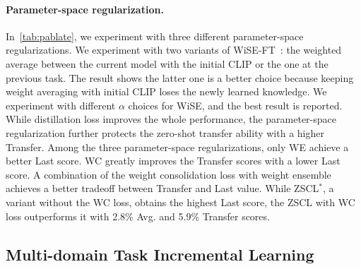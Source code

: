\paragraph{Parameter-space regularization.} In~\cref{tab:pablate}, we experiment with three different parameter-space regularizations. 
We experiment with two variants of WiSE-FT~\cite{wortsman2022robust}: the weighted average between the current model with the initial CLIP or the one at the previous task. The result shows the latter one is a better choice because keeping weight averaging with initial CLIP loses the newly learned knowledge. 
We experiment with different $\alpha$ choices for WiSE, and the best result is reported. While distillation loss improves the whole performance, the parameter-space regularization further protects the zero-shot transfer ability with a higher Transfer. Among the three parameter-space regularizations, only WE achieve a better Last score.
WC greatly improves the Transfer scores with a lower Last score. A combination of the weight consolidation loss with weight ensemble achieves a better tradeoff between Transfer and Last value. While ZSCL$^*$, a variant without the WC loss, obtains the highest Last score, the ZSCL with WC loss outperforms it with 2.8\% Avg. and 5.9\% Transfer scores.

\subsection{Multi-domain Task Incremental Learning}
\label{subsec:mtcl}


